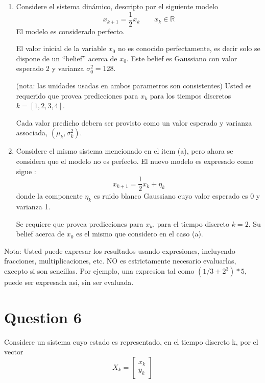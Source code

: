 \documentclass[parcial]{lcc}
\begin{document}
\begin{enumerate}

\item Considere el sistema dinámico, descripto por el siguiente modelo 
\begin{equation*}
    x_{k+1} = \frac{1}{2}x_{k} \qquad x_{k} \in \mathbb{R}
\end{equation*}
El modelo es considerado perfecto.

El valor inicial de la variable $x_0$ no es conocido perfectamente, es decir solo se dispone de un ``belief'' acerca de  $x_0$. Este belief es Gaussiano con valor esperado 2 y varianza $\sigma^2_{0} = 128$.

(nota: las unidades usadas en ambos parametros son consistentes)
Usted es requerido que provea predicciones para $x_k$ para los tiempos discretos $k=[1,2,3,4]$.

Cada valor predicho debera ser provisto como un valor esperado y varianza associada,
$\left(\mu_{k}, \sigma_{k}^2\right)$.

\item Considere el mismo sistema mencionado en el item (a), pero ahora se considera que el modelo no es perfecto. El nuevo modelo es expresado como sigue :
\begin{equation*}
    x_{k+1} = \frac{1}{2}x_k + \eta_k
\end{equation*}
donde la componente $\eta_k$ es ruido blanco Gaussiano cuyo valor esperado es 0 y varianza 1.

Se requiere que provea predicciones para $x_{k}$, para el tiempo discreto $k=2$. Su belief acerca de $x_0$ es el mismo que considero en el caso (a).

\end{enumerate}

Nota: Usted puede expresar los resultados usando expresiones, incluyendo fracciones, multiplicaciones, etc. NO es estrictamente necesario evaluarlas, excepto si son sencillas. Por ejemplo, una expresion tal como $(1/3 +2^3)*5$, puede ser expresada asi, sin ser evaluada.

\section*{Question 6}
Considere un sistema cuyo estado es representado, en el tiempo discreto k, por el vector
\begin{equation*}
    X_{k} = \begin{bmatrix}
            x_{k}\\
            y_{k}
        \end{bmatrix}
\end{equation*}
\end{document}
